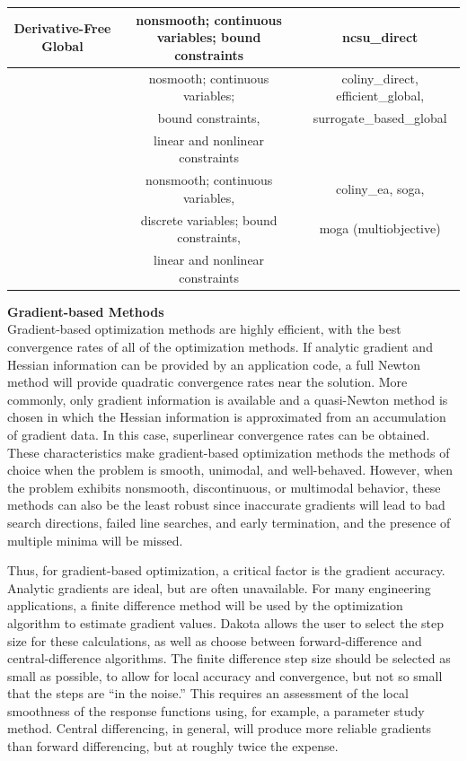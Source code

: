 \begin{table}[hbp]
\begin{tabular}{|c|c|c|}
\hline
Derivative-Free Global & nonsmooth; continuous variables; bound constraints
& ncsu\_direct \\
\hline
         & nosmooth; continuous variables; & coliny\_direct, efficient\_global, \\
         & bound constraints, & surrogate\_based\_global \\
         & linear and nonlinear constraints & \\
\hline
         & nonsmooth; continuous variables, & coliny\_ea, soga, \\
         & discrete variables; bound constraints, & moga (multiobjective) \\
         & linear and nonlinear constraints & \\
\hline
\end{tabular}
\end{table}

{\bf Gradient-based Methods} \\
Gradient-based optimization methods are highly efficient, with the
best convergence rates of all of the optimization methods. If analytic
gradient and Hessian information can be provided by an application
code, a full Newton method will provide quadratic convergence rates
near the solution. More commonly, only gradient information is
available and a quasi-Newton method is chosen in which the Hessian
information is approximated from an accumulation of gradient data. In
this case, superlinear convergence rates can be obtained. These
characteristics make gradient-based optimization methods the methods
of choice when the problem is smooth, unimodal, and
well-behaved. However, when the problem exhibits nonsmooth,
discontinuous, or multimodal behavior, these methods can also be the
least robust since inaccurate gradients will lead to bad search
directions, failed line searches, and early termination, and the
presence of multiple minima will be missed.

Thus, for gradient-based optimization, a critical factor is the
gradient accuracy. Analytic gradients are ideal, but are often
unavailable. For many engineering applications, a finite difference
method will be used by the optimization algorithm to estimate gradient
values. Dakota allows the user to select the step size for these
calculations, as well as choose between forward-difference and
central-difference algorithms. The finite difference step size should
be selected as small as possible, to allow for local accuracy and
convergence, but not so small that the steps are ``in the noise.''
This requires an assessment of the local smoothness of the response
functions using, for example, a parameter study method. Central
differencing, in general, will produce more reliable gradients than
forward differencing, but at roughly twice the expense.

